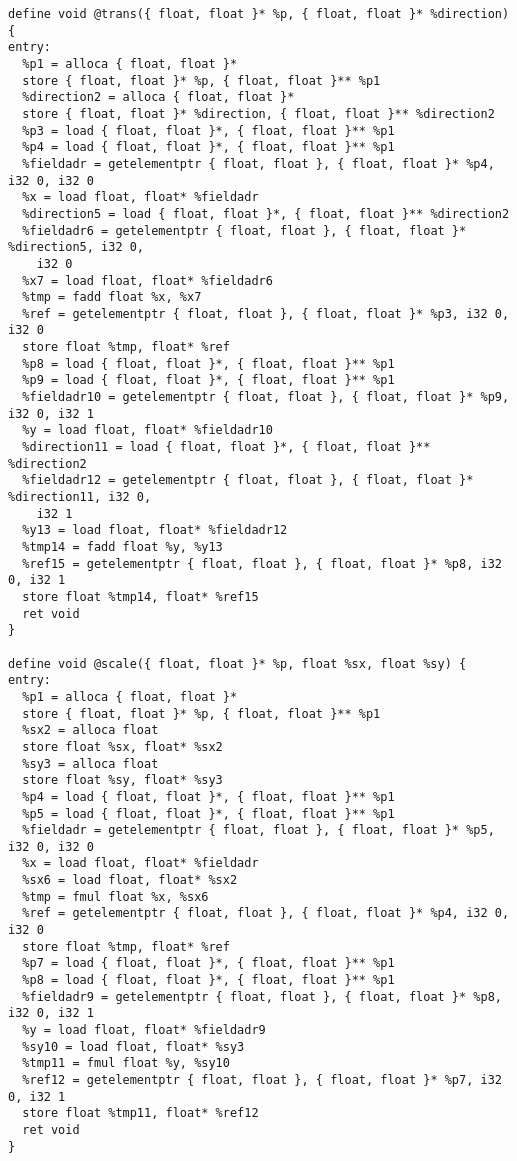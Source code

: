 \documentclass[main.tex]{subfiles}
\begin{document}
{\begin{lstlisting}
define void @trans({ float, float }* %p, { float, float }* %direction) {
entry:
  %p1 = alloca { float, float }*
  store { float, float }* %p, { float, float }** %p1
  %direction2 = alloca { float, float }*
  store { float, float }* %direction, { float, float }** %direction2
  %p3 = load { float, float }*, { float, float }** %p1
  %p4 = load { float, float }*, { float, float }** %p1
  %fieldadr = getelementptr { float, float }, { float, float }* %p4, i32 0, i32 0
  %x = load float, float* %fieldadr
  %direction5 = load { float, float }*, { float, float }** %direction2
  %fieldadr6 = getelementptr { float, float }, { float, float }* %direction5, i32 0,
    i32 0
  %x7 = load float, float* %fieldadr6
  %tmp = fadd float %x, %x7
  %ref = getelementptr { float, float }, { float, float }* %p3, i32 0, i32 0
  store float %tmp, float* %ref
  %p8 = load { float, float }*, { float, float }** %p1
  %p9 = load { float, float }*, { float, float }** %p1
  %fieldadr10 = getelementptr { float, float }, { float, float }* %p9, i32 0, i32 1
  %y = load float, float* %fieldadr10
  %direction11 = load { float, float }*, { float, float }** %direction2
  %fieldadr12 = getelementptr { float, float }, { float, float }* %direction11, i32 0,
    i32 1
  %y13 = load float, float* %fieldadr12
  %tmp14 = fadd float %y, %y13
  %ref15 = getelementptr { float, float }, { float, float }* %p8, i32 0, i32 1
  store float %tmp14, float* %ref15
  ret void
}

define void @scale({ float, float }* %p, float %sx, float %sy) {
entry:
  %p1 = alloca { float, float }*
  store { float, float }* %p, { float, float }** %p1
  %sx2 = alloca float
  store float %sx, float* %sx2
  %sy3 = alloca float
  store float %sy, float* %sy3
  %p4 = load { float, float }*, { float, float }** %p1
  %p5 = load { float, float }*, { float, float }** %p1
  %fieldadr = getelementptr { float, float }, { float, float }* %p5, i32 0, i32 0
  %x = load float, float* %fieldadr
  %sx6 = load float, float* %sx2
  %tmp = fmul float %x, %sx6
  %ref = getelementptr { float, float }, { float, float }* %p4, i32 0, i32 0
  store float %tmp, float* %ref
  %p7 = load { float, float }*, { float, float }** %p1
  %p8 = load { float, float }*, { float, float }** %p1
  %fieldadr9 = getelementptr { float, float }, { float, float }* %p8, i32 0, i32 1
  %y = load float, float* %fieldadr9
  %sy10 = load float, float* %sy3
  %tmp11 = fmul float %y, %sy10
  %ref12 = getelementptr { float, float }, { float, float }* %p7, i32 0, i32 1
  store float %tmp11, float* %ref12
  ret void
}


\end{lstlisting}}
\end{document}
